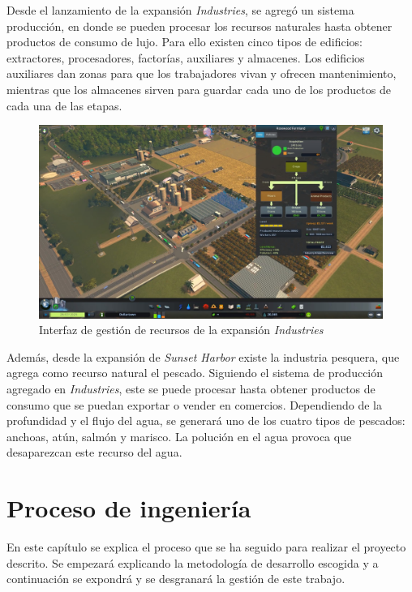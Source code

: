 Desde el lanzamiento de la expansión \textit{Industries}, se agregó un sistema producción, en donde se pueden procesar los recursos naturales hasta obtener productos de consumo de lujo. Para ello existen cinco tipos de edificios: extractores, procesadores, factorías, auxiliares y almacenes. Los edificios auxiliares dan zonas para que los trabajadores vivan y ofrecen mantenimiento, mientras que los almacenes sirven para guardar cada uno de los productos de cada una de las etapas.

\begin{figure}[!h]
	\centering
	\includegraphics[width=\textwidth]{images/industries}
	\caption{Interfaz de gestión de recursos de la expansión \textit{Industries}}
	\label{fig:industry}
\end{figure}

Además, desde la expansión de \textit{Sunset Harbor} existe la industria pesquera, que agrega como recurso natural el pescado. Siguiendo el sistema de producción agregado en \textit{Industries}, este se puede procesar hasta obtener productos de consumo que se puedan exportar o vender en comercios. Dependiendo de la profundidad y el flujo del agua, se generará uno de los cuatro tipos de pescados: anchoas, atún, salmón y marisco. La polución en el agua provoca que desaparezcan este recurso del agua.

\section{Proceso de ingeniería}

En este capítulo se explica el proceso que se ha seguido para realizar el proyecto descrito. Se empezará explicando la metodología de desarrollo escogida y a continuación se expondrá y se desgranará la gestión de este trabajo.

